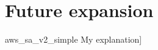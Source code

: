 \section{Future expansion}

\cite{capacity-planning-for-sap-on-aws}
\imagefigsingle
{aws_sa_v2_simple}
{My explanation]}
